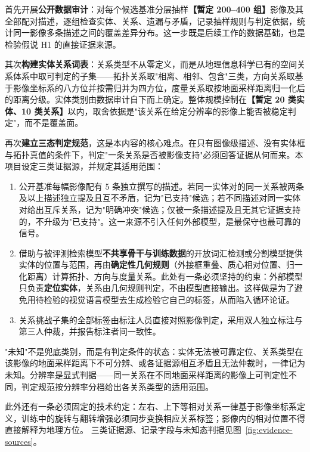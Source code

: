 首先开展\textbf{公开数据审计}：对每个候选基准分层抽样\textbf{【暂定 200--400 组】}影像及其全部配对描述，逐组检查实体、关系、遗漏与矛盾，记录抽样规则与判定依据，统计同一影像多条描述之间的覆盖差异分布。这一步既是后续工作的数据基础，也是检验假说 H1 的直接证据来源。

其次\textbf{构建实体关系词表}：关系类型不从零定义，而是从地理信息科学已有的空间关系体系中取可判定的子集——拓扑关系取"相离、相邻、包含"三类，方向关系取基于影像坐标系的八方位并按需归并为四方位，度量关系取按地面采样距离归一化后的距离分级。实体类别由数据审计自下而上确定。整体规模控制在\textbf{【暂定 20 类实体、10 类关系】}以内，取舍依据是"该关系在给定分辨率的影像上能否被稳定判定"，而不是覆盖面。

再次\textbf{建立三态判定规范}，这是本内容的核心难点。在只有图像级描述、没有实体框与拓扑真值的条件下，判定"一条关系是否被影像支持"必须回答证据从何而来。本项目设定三类证据源，并规定其适用范围：

\begin{enumerate}
    \item {}公开基准每幅影像配有 5 条独立撰写的描述\cite{lu2018rsicd,yuan2022amfmn}。若同一实体对的同一关系被两条及以上描述独立提及且互不矛盾，记为"已支持"候选；若不同描述对同一实体对给出互斥关系，记为"明确冲突"候选；仅被一条描述提及且无其它证据支持的，不升级为"已支持"。这一来源不引入任何外部模型，是最保守也最可靠的信号。
    \item {}借助与被评测检索模型\textbf{不共享骨干与训练数据}的开放词汇检测或分割模型提供实体的位置与范围，再由\textbf{确定性几何规则}（外接框重叠、质心相对位置、归一化距离）计算拓扑、方向与度量关系。此处有一条必须坚持的约束：外部模型只负责\textbf{定位实体}，关系由几何规则判定，不由模型直接输出。这样做是为了避免用待检验的视觉语言模型去生成检验它自己的标签，从而陷入循环论证。
    \item {}关系挑战子集的全部标签由标注人员直接对照影像判定，采用双人独立标注与第三人仲裁，并报告标注者间一致性。
\end{enumerate}

"未知"不是兜底类别，而是有判定条件的状态：实体无法被可靠定位、关系类型在该影像的地面采样距离下不可分辨、或各证据源相互矛盾且无法仲裁时，一律记为未知。分辨率是显式判据——同一关系在不同地面采样距离的影像上可判定性不同，判定规范按分辨率分档给出各关系类型的适用范围。

此外还有一条必须固定的技术约定：左右、上下等相对关系一律基于影像坐标系定义，训练中的旋转与翻转增强必须同步变换相应关系标签；影像内的相对位置不得直接解释为地理方位。 三类证据源、记录字段与未知态判据见图~\ref{fig:evidence-sources}。

